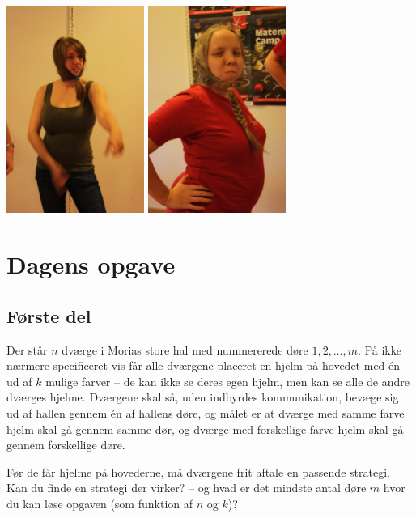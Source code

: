 \begin{minipage}[t]{100mm}
\vspace{3mm}
\includegraphics[width=45mm]{asv.jpg}
\includegraphics[width=45mm]{abr.jpg}


\section*{Dagens opgave}
\subsection*{Første del}
Der står $n$ dværge i Morias store hal med nummererede døre $1,2,\dotsc,m$. På ikke nærmere specificeret vis får alle dværgene placeret en hjelm på hovedet med én ud af $k$ mulige farver -- de kan ikke se deres egen hjelm, men kan se alle de andre dværges hjelme. Dværgene skal så, uden indbyrdes kommunikation, bevæge sig ud af hallen gennem én af hallens døre, og målet er at dværge med samme farve hjelm skal gå gennem samme dør, og dværge med forskellige farve hjelm skal gå gennem forskellige døre.
 
Før de får hjelme på hovederne, må dværgene frit aftale en passende strategi. Kan du finde en strategi der virker? -- og hvad er det mindste antal døre $m$ hvor du kan løse opgaven (som funktion af $n$ og $k$)?


\end{minipage}
